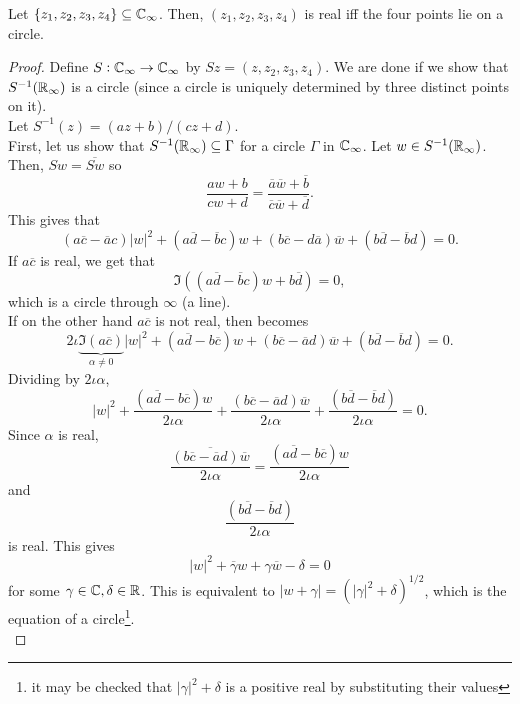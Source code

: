 	\begin{lemma}
		\label{thm: mobius real to circle}
		Let $\{z_1,z_2,z_3,z_4\} \subseteq \mathbb{C}_\infty$. Then, $(z_1,z_2,z_3,z_4)$ is real iff the four points lie on a circle.
	\end{lemma}
	\begin{proof}
		Define $S:\mathbb{C}_\infty\to\mathbb{C}_\infty$ by $Sz = (z,z_2,z_3,z_4)$. We are done if we show that $S^{-1}(\mathbb{R}_\infty)$ is a circle (since a circle is uniquely determined by three distinct points on it).\\
		Let $S^{-1}(z) = (az+b)/(cz+d)$.\\

		First, let us show that $S^{-1}(\mathbb{R}_\infty) \subseteq \Gamma$ for a circle $\Gamma$ in $\mathbb{C}_\infty$. Let $w \in S^{-1}(\mathbb{R}_\infty)$. Then, $Sw = \overline{Sw}$ so
		\[ \frac{aw+b}{cw+d} = \frac{\overline{a}\overline{w} + \overline{b}}{\overline{c}\overline{w} + \overline{d}}. \]
		This gives that
		\begin{equation}
			\tag{(*)}
			\label{eqn: mobius circle real}
			(a\overline{c} - \overline{a}c)|w|^2 + (a\overline{d} - \overline{b}c)w + (b\overline{c} - d\overline{a})\overline{w} + (b\overline{d} - \overline{b}d) = 0.
		\end{equation}
		If $a\overline{c}$ is real, we get that
		\[ \Im\left((a\overline{d}-\overline{b}c)w + b\overline{d}\right) = 0, \]
		which is a circle through $\infty$ (a line).\\
		If on the other hand $a\overline{c}$ is not real, then  becomes
		\[ 2\iota\underbrace{\Im(a\overline{c})}_{\alpha \ne 0}|w|^2 + (a\overline{d} - b\overline{c})w + (b\overline{c} - \overline{a}d)\overline{w} + (b\overline{d} - \overline{b}d) = 0. \]
		Dividing by $2\iota\alpha$,
		\[ |w|^2 + \frac{(a\overline{d} - b\overline{c})w}{2\iota\alpha} + \frac{(b\overline{c} - \overline{a}d)\overline{w}}{2\iota\alpha} + \frac{(b\overline{d} - \overline{b}d)}{2\iota\alpha} = 0. \]
		Since $\alpha$ is real,
		\[ \overline{\frac{(b\overline{c} - \overline{a}d)\overline{w}}{2\iota\alpha}} = \frac{(a\overline{d} - b\overline{c})w}{2\iota\alpha} \]
		and
		\[ \frac{(b\overline{d} - \overline{b}d)}{2\iota\alpha} \]
		is real. This gives
		\[ |w|^2 + \overline{\gamma}w + \gamma\overline{w} - \delta = 0 \]
		for some $\gamma \in \mathbb{C}, \delta \in \mathbb{R}$. This is equivalent to $|w+\gamma| = (|\gamma|^2 + \delta)^{1/2}$, which is the equation of a circle\footnote{it may be checked that $|\gamma|^2 + \delta$ is a positive real by substituting their values}.\\


\end{proof}
